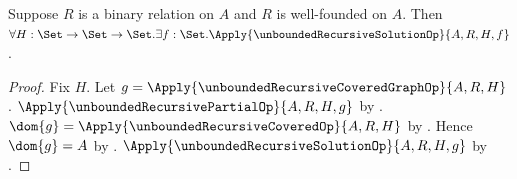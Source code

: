 \begin{theorem}\label{unbounded_well_founded_recursion_exists}
    Suppose $R$ is a binary relation on $A$ and $R$ is well-founded on $A$.
    Then $\forall H:\Set\to\Set\to\Set.
        \exists f:\Set.
            \Apply{\unboundedRecursiveSolutionOp}
                {A,R,H,f}$.
\end{theorem}
\begin{proof}
    Fix $H$.
    Let $g=\Apply{\unboundedRecursiveCoveredGraphOp}
        {A,R,H}$.
    $\Apply{\unboundedRecursivePartialOp}
        {A,R,H,g}$ by
        .
    $\dom{g}
        =\Apply{\unboundedRecursiveCoveredOp}
            {A,R,H}$ by
        .
    Hence $\dom{g}=A$ by
        .
    $\Apply{\unboundedRecursiveSolutionOp}
        {A,R,H,g}$ by .
\end{proof}

